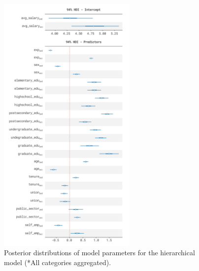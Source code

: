 \begin{figure}[H]
    \centering
    \includegraphics[width=0.6\textwidth]{images/appendix/hierarchical.png}
    \caption{Posterior distributions of model parameters for the hierarchical model (*All categories aggregated).}
    \label{fig:posterior_dists_hierarchical}
\end{figure}

